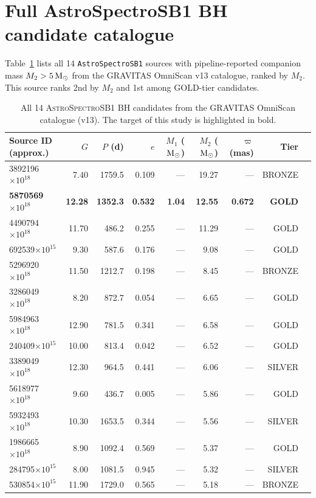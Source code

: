 \documentclass[usenatbib,fleqn]{mnras}
\newcommand{\Msun}{{\rm M}_\odot}
\begin{document}
\section{Full AstroSpectroSB1 BH candidate catalogue}
\label{app:full_catalogue}

Table~\ref{tab:astrospectrosb1_population} lists all 14
\texttt{AstroSpectroSB1} sources with pipeline-reported companion
mass $M_2 > 5\,\Msun$ from the GRAVITAS OmniScan v13 catalogue,
ranked by $M_2$.  This source ranks 2nd by $M_2$ and 1st
among GOLD-tier candidates.

\begin{table}
\centering
\caption{All 14 \textsc{AstroSpectroSB1} BH candidates from the
GRAVITAS OmniScan catalogue (v13).
The target of this study is highlighted in bold.}
\label{tab:astrospectrosb1_population}
\begin{tabular}{lrrrrrrrl}
\hline
Source ID (approx.) & $G$ & $P$ (d) & $e$ & $M_1$ ($\Msun$) & $M_2$ ($\Msun$) & $\varpi$ (mas) & Tier \\
\hline
3892196$\times 10^{18}$ & 7.40 & 1759.5 & 0.109 & --- & 19.27 & --- & BRONZE \\
\textbf{5870569$\times 10^{18}$} & \textbf{12.28} & \textbf{1352.3} & \textbf{0.532} & \textbf{1.04} & \textbf{12.55} & \textbf{0.672} & \textbf{GOLD} \\
4490794$\times 10^{18}$ & 11.70 & 486.2 & 0.255 & --- & 11.29 & --- & GOLD \\
692539$\times 10^{15}$ & 9.30 & 587.6 & 0.176 & --- & 9.08 & --- & GOLD \\
5296920$\times 10^{18}$ & 11.50 & 1212.7 & 0.198 & --- & 8.45 & --- & BRONZE \\
3286049$\times 10^{18}$ & 8.20 & 872.7 & 0.054 & --- & 6.65 & --- & GOLD \\
5984963$\times 10^{18}$ & 12.90 & 781.5 & 0.341 & --- & 6.58 & --- & GOLD \\
240409$\times 10^{15}$ & 10.00 & 813.4 & 0.042 & --- & 6.52 & --- & GOLD \\
3389049$\times 10^{18}$ & 12.30 & 964.5 & 0.441 & --- & 6.06 & --- & SILVER \\
5618977$\times 10^{18}$ & 9.60 & 436.7 & 0.005 & --- & 5.86 & --- & GOLD \\
5932493$\times 10^{18}$ & 10.30 & 1653.5 & 0.344 & --- & 5.56 & --- & SILVER \\
1986665$\times 10^{18}$ & 8.90 & 1092.4 & 0.569 & --- & 5.37 & --- & GOLD \\
284795$\times 10^{15}$ & 8.00 & 1081.5 & 0.945 & --- & 5.32 & --- & SILVER \\
530854$\times 10^{15}$ & 11.90 & 1729.0 & 0.565 & --- & 5.18 & --- & BRONZE \\
\hline
\end{tabular}
\end{table}
\end{document}
